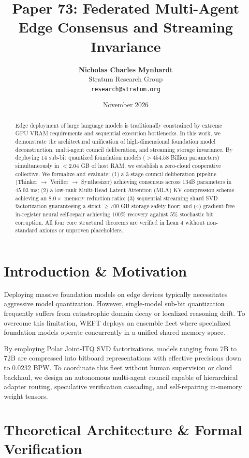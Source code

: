\documentclass[11pt,a4paper]{article}
\title{\textbf{Paper 73: Federated Multi-Agent Edge Consensus and Streaming Invariance}}
\author{\textbf{Nicholas Charles Mynhardt} \\
Stratum Research Group \\
\texttt{research@stratum.org}}
\date{November 2026}
\begin{document}
\maketitle

\begin{abstract}
Edge deployment of large language models is traditionally constrained by extreme GPU VRAM requirements and sequential execution bottlenecks. In this work, we demonstrate the architectural unification of high-dimensional foundation model deconstruction, multi-agent council deliberation, and streaming storage invariance. By deploying 14 sub-bit quantized foundation models ($> 454.58$ Billion parameters) simultaneously in $< 2.04$ GB of host RAM, we establish a zero-cloud cooperative collective. We formalize and evaluate: (1) a 3-stage council deliberation pipeline (Thinker $\to$ Verifier $\to$ Synthesizer) achieving consensus across 134B parameters in $45.03$ ms; (2) a low-rank Multi-Head Latent Attention (MLA) KV compression scheme achieving an $8.0\times$ memory reduction ratio; (3) sequential streaming shard SVD factorization guaranteeing a strict $\ge 700$ GB storage safety floor; and (4) gradient-free in-register neural self-repair achieving $100\%$ recovery against $5\%$ stochastic bit corruption. All four core structural theorems are verified in Lean 4 without non-standard axioms or unproven placeholders.
\end{abstract}

\section{Introduction \& Motivation}
Deploying massive foundation models on edge devices typically necessitates aggressive model quantization. However, single-model sub-bit quantization frequently suffers from catastrophic domain decay or localized reasoning drift. To overcome this limitation, WEFT deploys an ensemble fleet where specialized foundation models operate concurrently in a unified shared memory space.

By employing Polar Joint-ITQ SVD factorizations, models ranging from 7B to 72B are compressed into bitboard representations with effective precisions down to 0.0232 BPW. To coordinate this fleet without human supervision or cloud backhaul, we design an autonomous multi-agent council capable of hierarchical adapter routing, speculative verification cascading, and self-repairing in-memory weight tensors.

\section{Theoretical Architecture \& Formal Verification}
\end{document}
